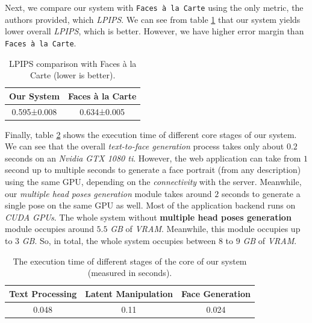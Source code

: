 Next, we compare our system with \texttt{Faces à la Carte} using the only metric, the authors provided, which \emph{LPIPS}. We can see from table \ref{tab:lpips_comp} that our system yields lower overall \emph{LPIPS}, which is better. However, we have higher error margin than \texttt{Faces à la Carte}.

\begin{table}[ht]
\centering
\caption{LPIPS comparison with Faces à la Carte (lower is better).}
\begin{tabular}[t]{| c | c |}
\hline
Our System & Faces à la Carte \\
\hline
\hline
0.595±0.008 & 0.634±0.005 \\
\hline
\end{tabular}
\label{tab:lpips_comp}
\end{table}

Finally, table \ref{tab:exec_time} shows the execution time of different core stages of our system. We can see that the overall \emph{text-to-face generation} process takes only about $0.2$ seconds on an \emph{Nvidia GTX 1080 ti}. However, the web application can take from $1$ second up to multiple seconds to generate a face portrait (from any description) using the same GPU, depending on the \emph{connectivity} with the server. Meanwhile, our \emph{multiple head poses generation} module takes around $2$ seconds to generate a single pose on the same GPU as well. Most of the application backend runs on \emph{CUDA GPUs}. The whole system without \textbf{multiple head poses generation} module occupies around $5.5$ \emph{GB} of \emph{VRAM}. Meanwhile, this module occupies up to $3$ \emph{GB}. So, in total, the whole system occupies between $8$ to $9$ \emph{GB} of \emph{VRAM}.

\begin{table}[ht]
\centering
\caption{The execution time of different stages of the core of our system (measured in seconds).}
\begin{tabular}[t]{| c | c | c |}
\hline
Text Processing & Latent Manipulation & Face Generation \\
\hline
\hline
0.048 & 0.11 & 0.024 \\
\hline
\end{tabular}
\label{tab:exec_time}
\end{table}
